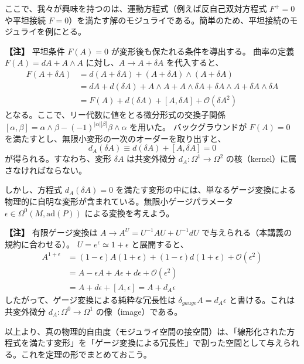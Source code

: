 \documentclass[uplatex, dvipdfmx, book]{jsbook}
\newenvironment{note}{\vspace{1ex}\par\footnotesize\noindent\textbf{【注】}}{\par\vspace{1ex}}
\begin{document}
ここで、我々が興味を持つのは、運動方程式（例えば反自己双対方程式 $F^+ = 0$ や平坦接続 $F = 0$）を満たす解のモジュライである。簡単のため、平坦接続のモジュライを例にとる。

\begin{note}
平坦条件 $F(A) = 0$ が変形後も保たれる条件を導出する。
曲率の定義 $F(A) = dA + A \wedge A$ に対し、$A \to A + \delta A$ を代入すると、
\begin{align*}
F(A + \delta A) &= d(A + \delta A) + (A + \delta A) \wedge (A + \delta A) \\
&= dA + d(\delta A) + A \wedge A + A \wedge \delta A + \delta A \wedge A + \delta A \wedge \delta A \\
&= F(A) + d(\delta A) + [A, \delta A] + \mathcal{O}(\delta A^2)
\end{align*}
となる。ここで、リー代数に値をとる微分形式の交換子関係 $[\alpha, \beta] = \alpha \wedge \beta - (-1)^{|\alpha||\beta|} \beta \wedge \alpha$ を用いた。
バックグラウンドが $F(A) = 0$ を満たすとし、無限小変形の一次のオーダーを取り出すと、
\begin{equation}
    d_A (\delta A) \equiv d(\delta A) + [A, \delta A] = 0
\end{equation}
が得られる。すなわち、変形 $\delta A$ は共変外微分 $d_A: \Omega^1 \to \Omega^2$ の核（kernel）に属さなければならない。
\end{note}

しかし、方程式 $d_A(\delta A) = 0$ を満たす変形の中には、単なるゲージ変換による物理的に自明な変形が含まれている。無限小ゲージパラメータ $\epsilon \in \Omega^0(M, \mathrm{ad}(P))$ による変換を考えよう。

\begin{note}
有限ゲージ変換は $A \to A^U = U^{-1} A U + U^{-1} d U$ で与えられる（本講義の規約に合わせる）。
$U = e^\epsilon \simeq 1 + \epsilon$ と展開すると、
\begin{align*}
A^{1+\epsilon} &= (1 - \epsilon) A (1 + \epsilon) + (1 - \epsilon) d(1 + \epsilon) + \mathcal{O}(\epsilon^2) \\
&= A - \epsilon A + A \epsilon + d\epsilon + \mathcal{O}(\epsilon^2) \\
&= A + d\epsilon + [A, \epsilon] = A + d_A \epsilon
\end{align*}
したがって、ゲージ変換による純粋な冗長性は $\delta_{gauge} A = d_A \epsilon$ と書ける。これは共変外微分 $d_A: \Omega^0 \to \Omega^1$ の像（image）である。
\end{note}

以上より、真の物理的自由度（モジュライ空間の接空間）は、「線形化された方程式を満たす変形」を「ゲージ変換による冗長性」で割った空間として与えられる。これを定理の形でまとめておこう。
\end{document}
